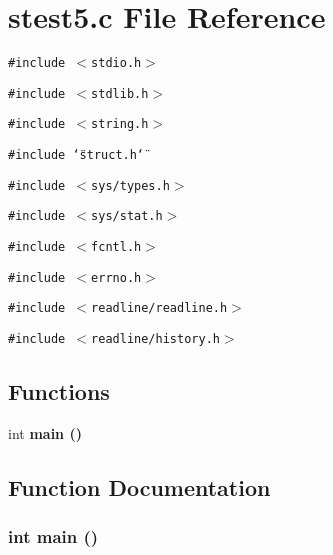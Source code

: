 \section{stest5.c File Reference}
\label{stest5_8c}
{\tt \#include $<$stdio.h$>$}\par
{\tt \#include $<$stdlib.h$>$}\par
{\tt \#include $<$string.h$>$}\par
{\tt \#include \char`\"{}struct.h\char`\"{}}\par
{\tt \#include $<$sys/types.h$>$}\par
{\tt \#include $<$sys/stat.h$>$}\par
{\tt \#include $<$fcntl.h$>$}\par
{\tt \#include $<$errno.h$>$}\par
{\tt \#include $<$readline/readline.h$>$}\par
{\tt \#include $<$readline/history.h$>$}\par
\subsection*{Functions}
\begin{CompactItemize}
\item 
int \bf{main} ()
\end{CompactItemize}


\subsection{Function Documentation}
\subsubsection{\setlength{\rightskip}{0pt plus 5cm}int main ()}\label{stest5_8c_e66f6b31b5ad750f1fe042a706a4e3d4}


